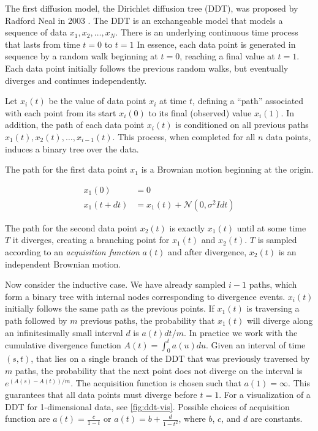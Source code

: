\documentclass{article}
\begin{document}
The first diffusion model, the Dirichlet diffusion tree (DDT),
was proposed by Radford Neal in 2003 \citep{Neal2003}.
The DDT is an exchangeable model that models a sequence of data
$x_1, x_2,\ldots,x_N$.
There is an underlying continuous time process
that lasts from time $t = 0$ to $t = 1$
In essence, each data point is generated in sequence by
a random walk beginning at $t = 0$,
reaching a final value at $t = 1$.
Each data point initially follows the previous
random walks, but eventually diverges and continues independently.

Let $x_i(t)$ be the value of data point $x_i$
at time $t$, defining a ``path'' associated
with each point from its start $x_i(0)$ to its final (observed) value $x_i(1)$.
In addition, the path of each data point $x_i(t)$ is conditioned
on all previous paths $x_1(t), x_2(t), \ldots, x_{i -1 }(t)$.
This process, when completed for all $n$ data points,
induces a binary tree over the data.

The path for the first data point $x_1$
is a Brownian motion
beginning at the origin.

\begin{align}
  x_1(0) &= 0 \\
  x_1(t + dt) &= x_1(t) + \mathcal{N}(0, \sigma^2Idt)
\end{align}

The path for the second data point $x_2(t)$
is exactly $x_1(t)$ until
at some time $T$ it diverges,
creating a branching point for
$x_1(t)$ and $x_2(t)$.
$T$ is sampled according to an \emph{acquisition function}
$a(t)$ and
after divergence, $x_2(t)$ is an
independent Brownian motion.

Now consider the inductive case.
We have already sampled $i - 1$
paths, which form a binary tree
with internal nodes corresponding to
divergence events.
$x_i(t)$ initially follows the same
path as the previous points.
If $x_1(t)$ is traversing a path
followed by $m$ previous paths,
the probability that $x_1(t)$ will
diverge along an infinitesimally small
interval $d$ is 
$a(t)dt/m$. 
In practice we work with the cumulative
divergence function $A(t) = \int_0^t a(u)du$.
Given an interval of time $(s, t)$,
that lies on a single branch of the DDT
that was previously traversed by $m$ paths,
the probability that the next point
does not diverge on the interval
is $e^{(A(s) - A(t))/m}$.
The acquisition function is chosen such that
$a(1) = \infty$. This guarantees that
all data points must diverge 
before $t = 1$. 
For a visualization of a DDT
for 1-dimensional data, see \autoref{fig:ddt-vis}.
Possible choices of acquisition function
are $a(t) = \frac{c}{1 - t}$ or $a(t) = b + \frac{d}{1 - t^2}$,
where $b$, $c$, and $d$ are constants.
\end{document}
